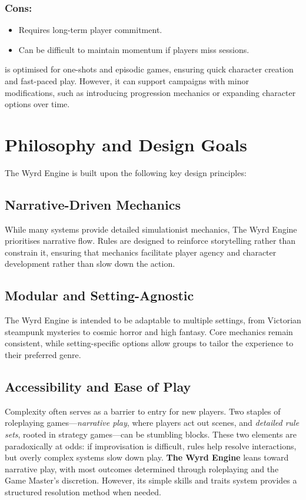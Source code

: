 \subsubsection{Cons:}
\begin{itemize}
    \item Requires long-term player commitment.
    \item Can be difficult to maintain momentum if players miss sessions.
\end{itemize}

\wyrd is optimised for one-shots and episodic games, ensuring quick character creation and fast-paced play. However, it can support campaigns with minor modifications, such as introducing progression mechanics or expanding character options over time.

\section{Philosophy and Design Goals}
The Wyrd Engine is built upon the following key design principles:

\subsection{Narrative-Driven Mechanics}
While many systems provide detailed simulationist mechanics, The Wyrd Engine prioritises narrative flow. Rules are designed to reinforce storytelling rather than constrain it, ensuring that mechanics facilitate player agency and character development rather than slow down the action.

\subsection{Modular and Setting-Agnostic}
The Wyrd Engine is intended to be adaptable to multiple settings, from Victorian steampunk mysteries to cosmic horror and high fantasy. Core mechanics remain consistent, while setting-specific options allow groups to tailor the experience to their preferred genre.

\subsection{Accessibility and Ease of Play}
Complexity often serves as a barrier to entry for new players. Two staples of roleplaying games—\emph{narrative play}, where players act out scenes, and \emph{detailed rule sets}, rooted in strategy games—can be stumbling blocks. These two elements are paradoxically at odds: if improvisation is difficult, rules help resolve interactions, but overly complex systems slow down play. \textbf{The Wyrd Engine} leans toward narrative play, with most outcomes determined through roleplaying and the Game Master's discretion. However, its simple skills and traits system provides a structured resolution method when needed.

